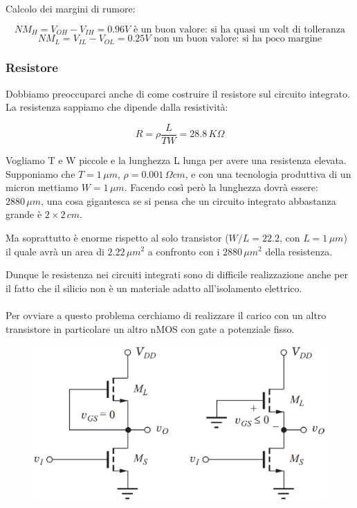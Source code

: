 Calcolo dei margini di rumore:

\begin{equation*}
    NM_H = V_{OH} - V_{IH} = 0.96V \text{ è un buon valore: si ha quasi un volt di tolleranza}
\end{equation*}
\begin{equation*}
    NM_L = V_{IL} - V_{OL} = 0.25 V \text{ non un buon valore: si ha poco margine}
\end{equation*}

\subsubsection{Resistore}

Dobbiamo preoccuparci anche di come costruire il resistore sul circuito integrato. La resistenza sappiamo che dipende dalla resistività:

\begin{equation*}
    R = \rho \frac{L}{TW} = 28.8\,K\Omega
\end{equation*}

Vogliamo T e W piccole e la lunghezza L lunga per avere una resistenza elevata. Supponiamo che $T = 1\,\mu m$, $\rho = 0.001 \,\Omega cm$, e con una tecnologia produttiva di un micron mettiamo $W = 1\,\mu m$. Facendo così però la lunghezza dovrà essere: $2880\,\mu m$, una cosa gigantesca se si pensa che un circuito integrato abbastanza grande è $2\times2 \,cm$.

Ma soprattutto è enorme rispetto al solo transistor ($W/L = 22.2$, con $L=1\,\mu m$) il quale avrà un area di $2.22\, \mu m^2$ a confronto con i $2880\, \mu m^2$ della resistenza.

Dunque le resistenza nei circuiti integrati sono di difficile realizzazione anche per il fatto che il silicio non è un materiale adatto all'isolamento elettrico.
\paragraph{}

Per ovviare a questo problema cerchiamo di 	realizzare	il	carico	con	un	altro	transistore in particolare un altro nMOS con gate a potenziale fisso.

\begin{figure}[htbp]
    \centering
    \includegraphics[width=0.5\linewidth]{img/nMOS_fisso.png}    
    
\end{figure}

